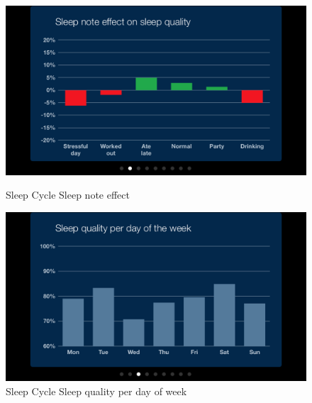 \begin{figure}[htbp]
  \centering
  \begin{minipage}[b]{0.47\textwidth}
    \centering
    \includegraphics[scale=0.25]{images/SleepCycle/SleepNoteEffectOnSleepQuality} 
    \caption{Sleep Cycle Sleep note effect}
    \label{fig:SCDetail}
  \end{minipage}
  \begin{minipage}[b]{0.47\textwidth}
    \centering
    \includegraphics[scale=0.25]{images/SleepCycle/SleepQualityPerDayOfWeek}  
    \caption{Sleep Cycle Sleep quality per day of week}
    \label{fig:SCSettings}
  \end{minipage}
\end{figure}


